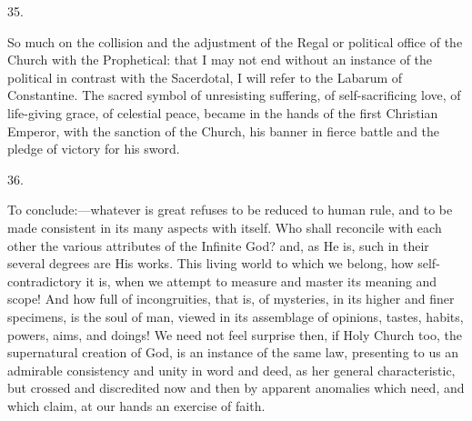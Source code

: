 35.

So much on the collision and the adjustment of the Regal or
political office of the Church with the Prophetical: that I may not
end without an instance of the political in contrast with the
Sacerdotal, I will refer to the Labarum of Constantine. The sacred
symbol of unresisting suffering, of self-sacrificing love, of
life-giving grace, of celestial peace, became in the hands of the
first Christian Emperor, with the sanction of the Church, his banner
in fierce battle and the pledge of victory for his sword.

36.

To conclude:—whatever is great refuses to be reduced to human
rule, and to be made consistent in its many aspects with itself. Who
shall reconcile with each other the various attributes of the Infinite
God? and, as He is, such in their several degrees are His works. This
living world to which we belong, how self-contradictory it is, when we
attempt to measure and master its meaning and scope! And how full of
incongruities, that is, of mysteries, in its higher and finer
specimens, is the soul of man, viewed in its assemblage of opinions,
tastes, habits, powers, aims, and doings! We need not feel surprise
then, if Holy Church too, the supernatural creation of God, is an
instance of the same law, presenting to us an admirable consistency
and unity in word and deed, as her general characteristic, but crossed
and discredited now and then by apparent anomalies which need, and
which claim, at our hands an exercise of faith.


